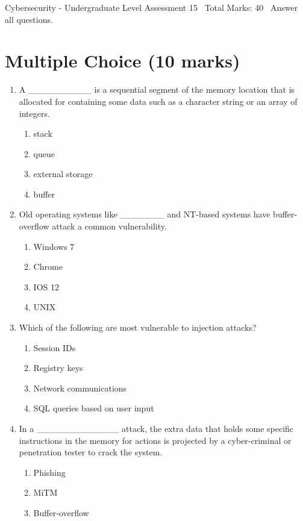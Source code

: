 \documentclass[12pt]{article}
\begin{document}
\begin{center}
Cybersecurity - Undergraduate Level Assessment 15 \
Total Marks: 40 \
Answer all questions.
\end{center}

\section*{Multiple Choice (10 marks)}
\begin{enumerate}[label=\arabic*.]
\item A \_\_\_\_\_\_\_\_\_\_ is a sequential segment of the memory location that is allocated for containing some data such as a character string or an array of integers.
\begin{enumerate}[label=(\alph*)]
    \item stack
    \item queue
    \item external storage
    \item buffer
\end{enumerate}
\item Old operating systems like \_\_\_\_\_\_\_ and NT-based systems have buffer-overflow attack a common vulnerability.
\begin{enumerate}[label=(\alph*)]
    \item Windows 7
    \item Chrome
    \item IOS 12
    \item UNIX
\end{enumerate}
\item Which of the following are most vulnerable to injection attacks?
\begin{enumerate}[label=(\alph*)]
    \item Session IDs
    \item Registry keys
    \item Network communications
    \item SQL queries based on user input
\end{enumerate}
\item In a \_\_\_\_\_\_\_\_\_\_\_\_\_ attack, the extra data that holds some specific instructions in the memory for actions is projected by a cyber-criminal or penetration tester to crack the system.
\begin{enumerate}[label=(\alph*)]
    \item Phishing
    \item MiTM
    \item Buffer-overflow

\end{enumerate}
\end{enumerate}
\end{document}

